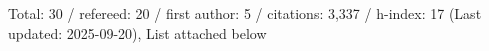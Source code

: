 Total: 30 / refereed: 20 / first author: 5 / citations: 3,337 / h-index: 17 (Last updated: 2025-09-20), List attached below